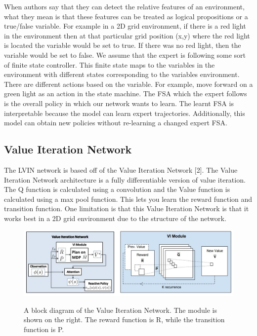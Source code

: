 \documentclass[letterpaper, 10 pt, conference]{ieeeconf}  %
\begin{document}
When authors say that they can detect the relative features of an environment, what they mean is that these features can be treated as logical propositions or a true/false variable. For example in a 2D grid environment, if there is a red light in the environment then at that particular grid position (x,y) where the red light is located the variable would be set to true. If there was no red light, then the variable would be set to false.
\newline
\indent We assume that the expert is following some sort of finite state controller. This finite state maps to the variables in the environment with different states corresponding to the variables environment. There are different actions based on the variable. For example, move forward on a green light as an action in the state machine. The FSA which the expert follows is the overall policy in which our network wants to learn. The learnt FSA is interpretable because the model can learn expert trajectories. Additionally, this model can obtain new policies without re-learning a changed expert FSA.

\subsection{Value Iteration Network} 
The LVIN network is based off of the Value Iteration Network [2]. The Value Iteration Network architecture is a fully differentiable version of value iteration. The Q function is calculated using a convolution and the Value function is calculated using a max pool function. This lets you learn the reward function and transition function. One limitation is that this Value Iteration Network is that it works best in a 2D grid environment due to the structure of the network.
\begin{figure}[h]
 \centering
 \includegraphics[scale=.33]{ValueIterationNetwork.JPG}\\
 \caption{A block diagram of the Value Iteration Network. The module is shown on the right. The reward function is R, while the transition function is P.}
\end{figure}
\newpage
\end{document}
